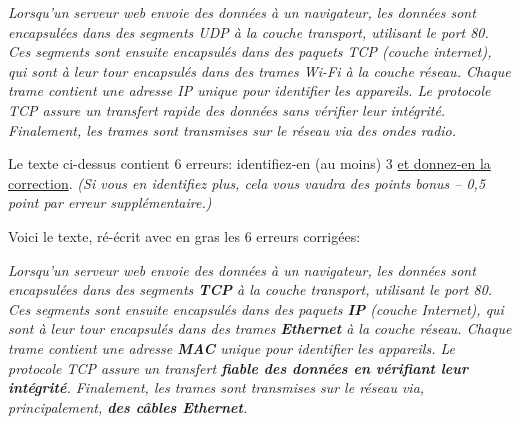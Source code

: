 \documentclass[11pt,a4paper]{exam}
\begin{document}
\begin{questions}
\begin{spacing}{1}
		
		
		\textit{Lorsqu'un serveur web envoie des données à un navigateur, les données sont encapsulées dans des segments UDP à la couche transport, utilisant le port 80. Ces segments sont ensuite encapsulés dans des paquets TCP (couche internet), qui sont à leur tour encapsulés dans des trames Wi-Fi à la couche réseau. Chaque trame contient une adresse IP unique pour identifier les appareils. Le protocole TCP assure un transfert rapide des données sans vérifier leur intégrité. Finalement, les trames sont transmises sur le réseau via des ondes radio.}
		
		Le texte ci-dessus contient 6 erreurs: identifiez-en (au moins) 3 \uline{et donnez-en la correction}. \textit{(Si vous en identifiez plus, cela vous vaudra des points bonus -- 0,5 point par erreur supplémentaire.)}
		\begin{solution}
			Voici le texte, ré-écrit avec en gras les 6 erreurs corrigées:
			
			\textit{Lorsqu’un serveur web envoie des données à un navigateur, les données sont encapsulées dans des segments \textbf{TCP} à la couche transport, utilisant le port 80. Ces segments sont ensuite encapsulés dans des paquets \textbf{IP} (couche Internet), qui sont à leur tour encapsulés dans des trames \textbf{Ethernet} à la couche réseau. Chaque trame contient une adresse \textbf{MAC} unique pour identifier les appareils. Le protocole TCP assure un transfert \textbf{fiable des données en vérifiant leur intégrité}. Finalement, les trames sont transmises sur le réseau via, principalement, \textbf{des câbles Ethernet}.}
		\end{solution}
        \end{spacing}
    \end{questions}
\end{document}
